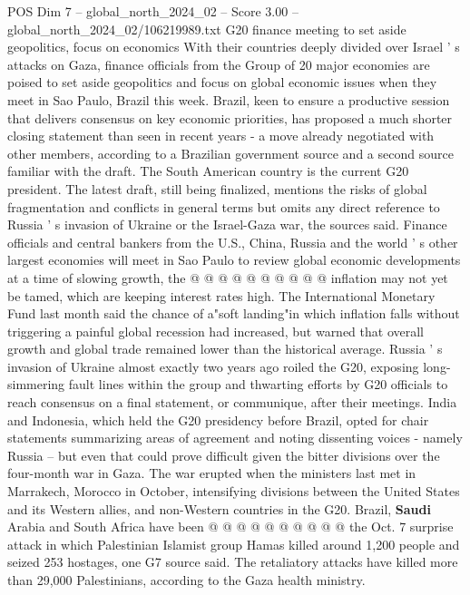 \begin{textsample}{POS Dim 7 – global\_north\_2024\_02 – Score 3.00 – global\_north\_2024\_02/106219989.txt}  \label{ex:f7_pos_166}
G20 finance meeting to set aside geopolitics, focus on economics With their countries deeply divided over Israel ' s attacks on Gaza, finance officials from the Group of 20 major economies are poised to set aside geopolitics and focus on global economic issues when they meet in Sao Paulo, Brazil this week.
Brazil, keen to ensure a productive session that delivers consensus on key economic priorities, has proposed a much shorter closing statement than seen in recent years - a move already negotiated with other members, according to a Brazilian government source and a second source familiar with the draft.
The South American country is the current G20 president.
The latest draft, still being finalized, mentions the risks of global fragmentation and conflicts in general terms but omits any direct reference to Russia ' s invasion of Ukraine or the Israel-Gaza war, the sources said.
Finance officials and central bankers from the U.S., China, Russia and the world ' s other largest economies will meet in Sao Paulo to review global economic developments at a time of slowing growth, the @ @ @ @ @ @ @ @ @ @ inflation may not yet be tamed, which are keeping interest rates high.
The International Monetary Fund last month said the chance of a"soft landing"in which inflation falls without triggering a painful global recession had increased, but warned that overall growth and global trade remained lower than the historical average.
Russia ' s invasion of Ukraine almost exactly two years ago roiled the G20, exposing long-simmering fault lines within the group and thwarting efforts by G20 officials to reach consensus on a final statement, or communique, after their meetings.
India and Indonesia, which held the G20 presidency before Brazil, opted for chair statements summarizing areas of agreement and noting dissenting voices - namely Russia -- but even that could prove difficult given the bitter divisions over the four-month war in Gaza.
The war erupted when the ministers last met in Marrakech, Morocco in October, intensifying divisions between the United States and its Western allies, and non-Western countries in the G20.
Brazil, \textbf{Saudi} Arabia and South Africa have been @ @ @ @ @ @ @ @ @ @ the Oct. 7 surprise attack in which Palestinian Islamist group Hamas killed around 1,200 people and seized 253 hostages, one G7 source said.
The retaliatory attacks have killed more than 29,000 Palestinians, according to the Gaza health ministry.

\end{textsample}
